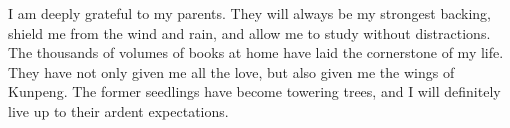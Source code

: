 \begin{acknowledgements}
I am deeply grateful to my parents. They will always be my strongest backing, shield me from the wind and rain, and allow me to study without distractions. The thousands of volumes of books at home have laid the cornerstone of my life. They have not only given me all the love, but also given me the wings of Kunpeng. The former seedlings have become towering trees, and I will definitely live up to their ardent expectations.
\end{acknowledgements}
